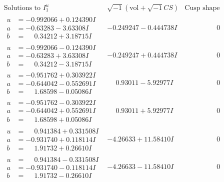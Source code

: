 \documentclass[1p]{elsarticle_modified}
\theoremstyle{definition}
\newcommand{\I}{\sqrt{-1}}
\begin{document}
$$\begin{array}{c|c|c}  
\text{Solutions to }I^u_{1}& \I (\text{vol} + \sqrt{-1}CS) & \text{Cusp shape}\\
 \hline 
\begin{aligned}
u &= -0.992066 + 0.124390 I \\
a &= -0.63283 - 3.63308 I \\
b &= \phantom{-}0.34212 + 3.18715 I\end{aligned}
 & -0.249247 - 0.444738 I & \phantom{-0.000000 } 0 \\ \hline\begin{aligned}
u &= -0.992066 - 0.124390 I \\
a &= -0.63283 + 3.63308 I \\
b &= \phantom{-}0.34212 - 3.18715 I\end{aligned}
 & -0.249247 + 0.444738 I & \phantom{-0.000000 } 0 \\ \hline\begin{aligned}
u &= -0.951762 + 0.303922 I \\
a &= -0.644042 - 0.552691 I \\
b &= \phantom{-}1.68598 - 0.05086 I\end{aligned}
 & \phantom{-}0.93011 - 5.92977 I & \phantom{-0.000000 } 0 \\ \hline\begin{aligned}
u &= -0.951762 - 0.303922 I \\
a &= -0.644042 + 0.552691 I \\
b &= \phantom{-}1.68598 + 0.05086 I\end{aligned}
 & \phantom{-}0.93011 + 5.92977 I & \phantom{-0.000000 } 0 \\ \hline\begin{aligned}
u &= \phantom{-}0.941384 + 0.331508 I \\
a &= -0.931740 + 0.118114 I \\
b &= \phantom{-}1.91732 + 0.26610 I\end{aligned}
 & -4.26633 + 11.58410 I & \phantom{-0.000000 } 0 \\ \hline\begin{aligned}
u &= \phantom{-}0.941384 - 0.331508 I \\
a &= -0.931740 - 0.118114 I \\
b &= \phantom{-}1.91732 - 0.26610 I\end{aligned}
 & -4.26633 - 11.58410 I & \phantom{-0.000000 } 0 \\ \hline\begin{aligned}

\end{aligned}
\end{array}$$
\end{document}
